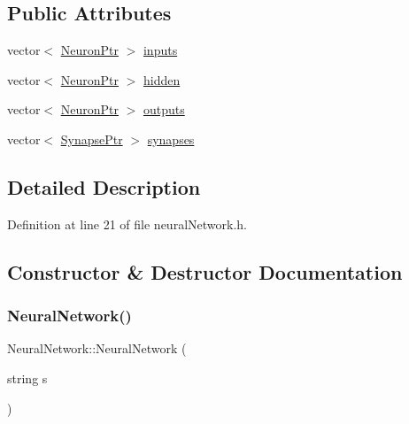 \subsection*{Public Attributes}
\begin{DoxyCompactItemize}
\item 
vector$<$ \hyperlink{neural_network_8h_af4884b0194f2598e689c894b76d0d92c}{Neuron\+Ptr} $>$ \hyperlink{class_neural_network_ae9ab96e97eef53bf8080001cf90075b8}{inputs}
\item 
vector$<$ \hyperlink{neural_network_8h_af4884b0194f2598e689c894b76d0d92c}{Neuron\+Ptr} $>$ \hyperlink{class_neural_network_a34c4927691004c6a9a637e82f9351d28}{hidden}
\item 
vector$<$ \hyperlink{neural_network_8h_af4884b0194f2598e689c894b76d0d92c}{Neuron\+Ptr} $>$ \hyperlink{class_neural_network_aa921b31f56ca042113bf250d603dabcd}{outputs}
\item 
vector$<$ \hyperlink{neural_network_8h_ac587b5c69519c070958c5cb318ddc50f}{Synapse\+Ptr} $>$ \hyperlink{class_neural_network_aa22ab04ac7e5b3bb8f291ff524e04ee3}{synapses}
\end{DoxyCompactItemize}


\subsection{Detailed Description}


Definition at line 21 of file neural\+Network.\+h.



\subsection{Constructor \& Destructor Documentation}
\mbox{\label{class_neural_network_ac46a25af2f5a1706adf9e798970939bb}} 
\subsubsection{\texorpdfstring{Neural\+Network()}{NeuralNetwork()}\hspace{0.1cm}{\footnotesize\ttfamily [1/3]}}
{\footnotesize\ttfamily Neural\+Network\+::\+Neural\+Network (\begin{DoxyParamCaption}\item[{string}]{s }\end{DoxyParamCaption})}



